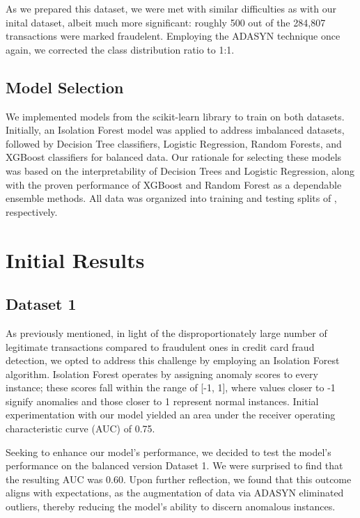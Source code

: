 \documentclass{article}
\begin{document}
As we prepared this dataset, we were met with similar difficulties as with our inital dataset, albeit much more significant: roughly 500 out of the 284,807 transactions were marked fraudelent. Employing the ADASYN technique once again, we corrected the class distribution ratio to 1:1.  

\subsection{Model Selection}

We implemented models from the scikit-learn library to train on both datasets. Initially, an Isolation Forest model was applied to address imbalanced datasets, followed by Decision Tree classifiers, Logistic Regression, Random Forests, and XGBoost classifiers for balanced data. Our rationale for selecting these models was based on the interpretability of Decision Trees and Logistic Regression, along with the proven performance of XGBoost and Random Forest as a dependable ensemble methods. All data was organized into training and testing splits of , respectively.

\section{Initial Results}

\subsection{Dataset 1}

As previously mentioned, in light of the disproportionately large number of legitimate transactions compared to fraudulent ones in credit card fraud detection, we opted to address this challenge by employing an Isolation Forest algorithm.  Isolation Forest operates by assigning anomaly scores to every instance; these scores fall within the range of [-1, 1], where values closer to -1 signify anomalies and those closer to 1 represent normal instances. Initial experimentation with our model yielded an area under the receiver operating characteristic curve (AUC) of 0.75. 

Seeking to enhance our model's performance, we decided to test the model's performance on the balanced version Dataset 1. We were surprised to find that the resulting AUC was 0.60. Upon further reflection, we found that this outcome aligns with expectations, as the augmentation of data via ADASYN eliminated outliers, thereby reducing the model's ability to discern anomalous instances.
\end{document}
